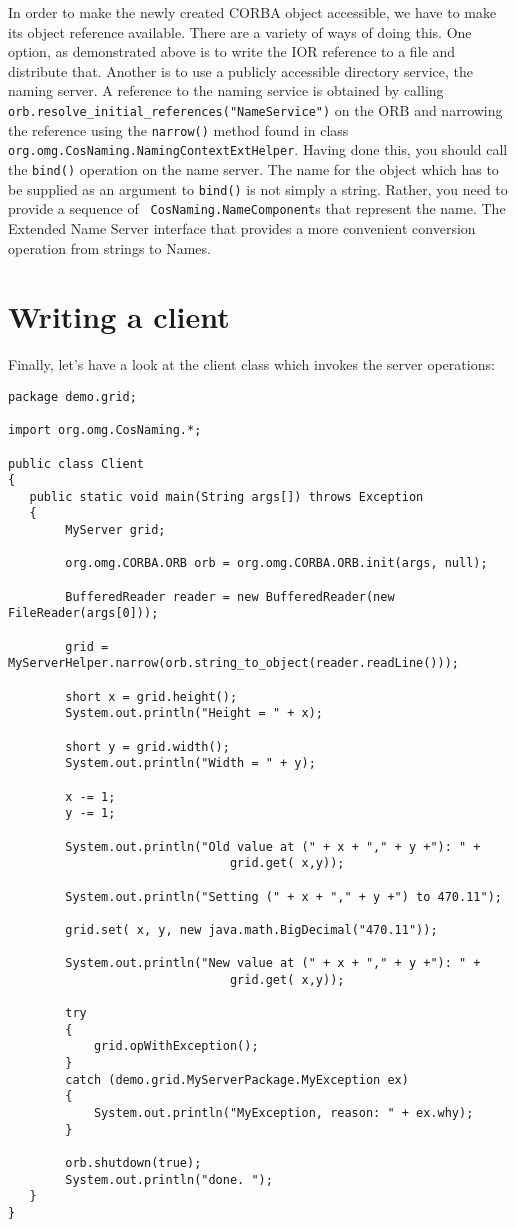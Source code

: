 In order to make the newly created CORBA object accessible, we have to
make its  object reference  available. There are a variety of ways of
doing this. One option, as demonstrated above is to write the IOR
reference to a file and distribute that. Another is to use a publicly
accessible directory  service, the naming  server. A reference  to the
naming      service     is      obtained      by     calling      {\tt
orb.resolve\_initial\_references("NameService")}   on   the  ORB   and
narrowing the reference using the {\tt narrow()} method found in class
{\tt org.omg.CosNaming.NamingContextExtHelper}.  Having done this, you
should call the  {\tt bind()} operation on the  name server.  The name
for the object which has to be supplied as an argument to {\tt bind()}
is not simply a string. Rather, you need to provide a sequence of {\tt
CosNaming.NameComponent}s that represent the  name. The Extended Name
Server interface that provides a more convenient conversion operation
from strings to Names.


\section{Writing a client}

Finally, let's have a look at the client class which invokes the
server operations:

\small{
\begin{verbatim}
package demo.grid;

import org.omg.CosNaming.*;

public class Client
{
   public static void main(String args[]) throws Exception
   {
        MyServer grid;

        org.omg.CORBA.ORB orb = org.omg.CORBA.ORB.init(args, null);

        BufferedReader reader = new BufferedReader(new FileReader(args[0]));

        grid = MyServerHelper.narrow(orb.string_to_object(reader.readLine()));

        short x = grid.height();
        System.out.println("Height = " + x);

        short y = grid.width();
        System.out.println("Width = " + y);

        x -= 1;
        y -= 1;

        System.out.println("Old value at (" + x + "," + y +"): " +
                               grid.get( x,y));

        System.out.println("Setting (" + x + "," + y +") to 470.11");

        grid.set( x, y, new java.math.BigDecimal("470.11"));

        System.out.println("New value at (" + x + "," + y +"): " +
                               grid.get( x,y));

        try
        {
            grid.opWithException();
        }
        catch (demo.grid.MyServerPackage.MyException ex)
        {
            System.out.println("MyException, reason: " + ex.why);
        }

        orb.shutdown(true);
        System.out.println("done. ");
   }
}
\end{verbatim}
}

